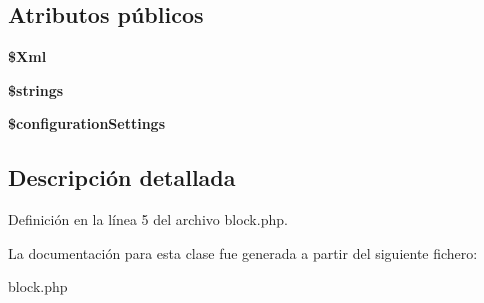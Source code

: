 \subsection*{\-Atributos públicos}
\begin{DoxyCompactItemize}
\item 
\hypertarget{classblock_a1c94cbb3bc0af9407e08d5bf372c1a45}{{\bfseries \$\-Xml}}\label{classblock_a1c94cbb3bc0af9407e08d5bf372c1a45}

\item 
\hypertarget{classblock_a253606399d635e084dee7745be77f925}{{\bfseries \$strings}}\label{classblock_a253606399d635e084dee7745be77f925}

\item 
\hypertarget{classblock_a7793d302164a793a4b94620e90f019f1}{{\bfseries \$configuration\-Settings}}\label{classblock_a7793d302164a793a4b94620e90f019f1}

\end{DoxyCompactItemize}


\subsection{\-Descripción detallada}


\-Definición en la línea 5 del archivo block.\-php.



\-La documentación para esta clase fue generada a partir del siguiente fichero\-:\begin{DoxyCompactItemize}
\item 
block.\-php\end{DoxyCompactItemize}
